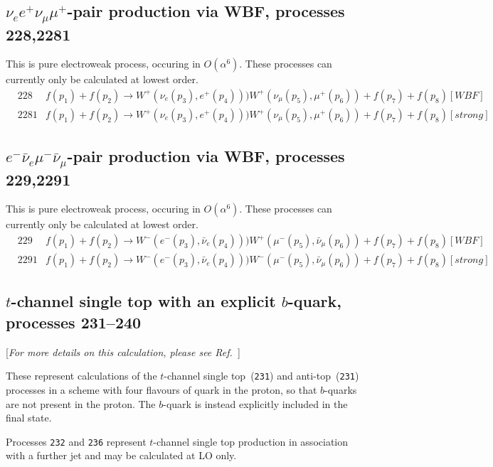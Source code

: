 \subsection{$\nu_{e} e^+ \nu_{\mu} \mu^+ $-pair production via WBF, processes 228,2281}
This is pure electroweak process, occuring in $O(\alpha^6)$.
These processes can currently only be calculated at lowest order.
\begin{eqnarray}
&228  &  f(p_1)+f(p_2) \to W^+(\nu_e(p_3),e^+(p_4)))W^+(\nu_\mu(p_5),\mu^+(p_6))+f(p_7)+f(p_8) [WBF]    \nonumber \\
&2281 &  f(p_1)+f(p_2) \to W^+(\nu_e(p_3),e^+(p_4)))W^+(\nu_\mu(p_5),\mu^+(p_6))+f(p_7)+f(p_8) [strong]     \nonumber
\end{eqnarray}
\subsection{$e^- \bar{\nu}_{e} \mu^- \bar{\nu}_{\mu} $-pair production via WBF, processes 229,2291}
This is pure electroweak process, occuring in $O(\alpha^6)$.
These processes can currently only be calculated at lowest order.
\begin{eqnarray}
& 229 &   f(p_1)+f(p_2) \to W^-(e^-(p_3),\bar{\nu}_e(p_4)))W^+(\mu^-(p_5),\bar{\nu}_\mu(p_6))+f(p_7)+f(p_8) [WBF]   
\nonumber \\
&2291 &  f(p_1)+f(p_2) \to W^-(e^-(p_3),\bar{\nu}_e(p_4)))W^-(\mu^-(p_5),\bar{\nu}_\mu(p_6))+f(p_7)+f(p_8) [strong]  
\nonumber  
\end{eqnarray}

\subsection{$t$-channel single top with an explicit $b$-quark, processes 231--240}
\label{subsec:stopb}

\begin{center}
[{\it For more details on this calculation, please see Ref.~\cite{Campbell:2009ss}}]
\end{center}

These represent calculations of the $t$-channel single top~({\tt 231}) and anti-top~({\tt 231})
processes in a scheme with four flavours of quark in the proton, so that $b$-quarks are not present in the proton.
The $b$-quark is instead explicitly included in the final state.

Processes {\tt 232} and {\tt 236} represent $t$-channel single top production in association
with a further jet and may be calculated at LO only.

